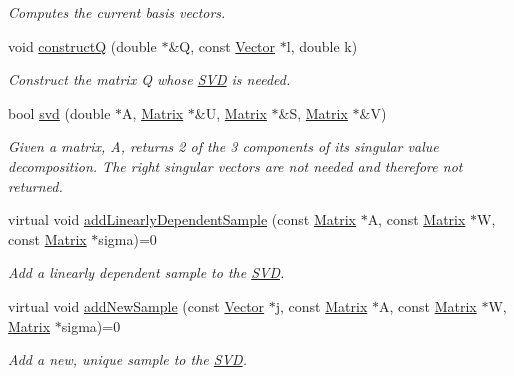 \begin{DoxyCompactItemize}
\begin{DoxyCompactList}\small\item\em Computes the current basis vectors. \end{DoxyCompactList}\item 
void \hyperlink{class_c_a_r_o_m_1_1_incremental_s_v_d_a91e61d07d81e6aa52601ec435984919f}{construct\-Q} (double $\ast$\&Q, const \hyperlink{class_c_a_r_o_m_1_1_vector}{Vector} $\ast$l, double k)
\begin{DoxyCompactList}\small\item\em Construct the matrix Q whose \hyperlink{class_c_a_r_o_m_1_1_s_v_d}{S\-V\-D} is needed. \end{DoxyCompactList}\item 
bool \hyperlink{class_c_a_r_o_m_1_1_incremental_s_v_d_aade80460f0cfb9f6b66e07089b647802}{svd} (double $\ast$A, \hyperlink{class_c_a_r_o_m_1_1_matrix}{Matrix} $\ast$\&U, \hyperlink{class_c_a_r_o_m_1_1_matrix}{Matrix} $\ast$\&S, \hyperlink{class_c_a_r_o_m_1_1_matrix}{Matrix} $\ast$\&V)
\begin{DoxyCompactList}\small\item\em Given a matrix, A, returns 2 of the 3 components of its singular value decomposition. The right singular vectors are not needed and therefore not returned. \end{DoxyCompactList}\item 
virtual void \hyperlink{class_c_a_r_o_m_1_1_incremental_s_v_d_adfbd27cfba3479d79d5a4655205d1a3c}{add\-Linearly\-Dependent\-Sample} (const \hyperlink{class_c_a_r_o_m_1_1_matrix}{Matrix} $\ast$A, const \hyperlink{class_c_a_r_o_m_1_1_matrix}{Matrix} $\ast$W, const \hyperlink{class_c_a_r_o_m_1_1_matrix}{Matrix} $\ast$sigma)=0
\begin{DoxyCompactList}\small\item\em Add a linearly dependent sample to the \hyperlink{class_c_a_r_o_m_1_1_s_v_d}{S\-V\-D}. \end{DoxyCompactList}\item 
virtual void \hyperlink{class_c_a_r_o_m_1_1_incremental_s_v_d_a42963b41f3beb65b46d355f93fe3c8e4}{add\-New\-Sample} (const \hyperlink{class_c_a_r_o_m_1_1_vector}{Vector} $\ast$j, const \hyperlink{class_c_a_r_o_m_1_1_matrix}{Matrix} $\ast$A, const \hyperlink{class_c_a_r_o_m_1_1_matrix}{Matrix} $\ast$W, \hyperlink{class_c_a_r_o_m_1_1_matrix}{Matrix} $\ast$sigma)=0
\begin{DoxyCompactList}\small\item\em Add a new, unique sample to the \hyperlink{class_c_a_r_o_m_1_1_s_v_d}{S\-V\-D}. \end{DoxyCompactList}\item 

\end{DoxyCompactItemize}
